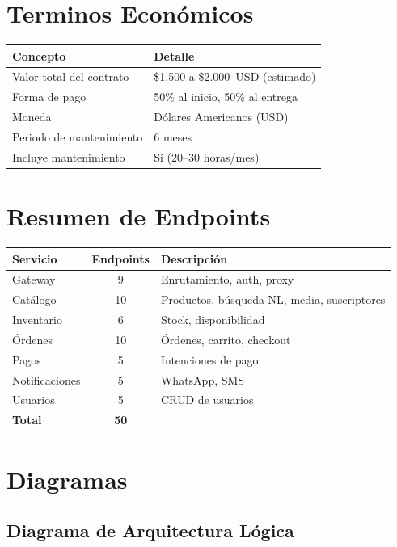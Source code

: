 \documentclass[11pt,a4paper]{article}
\newcommand{\contractvalue}{\$1.500 a \$2.000\ USD (estimado)}
\newcommand{\contractperiod}{6 meses}
\begin{document}
\section{Terminos Económicos}

\begin{tabularx}{\textwidth}{|l|X|}
\hline
\textbf{Concepto} & \textbf{Detalle} \\
\hline
Valor total del contrato & \contractvalue \\
Forma de pago & 50\% al inicio, 50\% al entrega \\
Moneda & Dólares Americanos (USD) \\
Periodo de mantenimiento & \contractperiod \\
Incluye mantenimiento & Sí (20--30 horas/mes) \\
\hline
\end{tabularx}

\section{Resumen de Endpoints}

\begin{tabularx}{\textwidth}{|l|c|X|}
\hline
\textbf{Servicio} & \textbf{Endpoints} & \textbf{Descripción} \\
\hline
Gateway & 9 & Enrutamiento, auth, proxy \\
Catálogo & 10 & Productos, búsqueda NL, media, suscriptores \\
Inventario & 6 & Stock, disponibilidad \\
Órdenes & 10 & Órdenes, carrito, checkout \\
Pagos & 5 & Intenciones de pago \\
Notificaciones & 5 & WhatsApp, SMS \\
Usuarios & 5 & CRUD de usuarios \\
\hline
\textbf{Total} & \textbf{50} & \\
\hline
\end{tabularx}

\section{Diagramas}

\subsection{Diagrama de Arquitectura Lógica}
\end{document}
